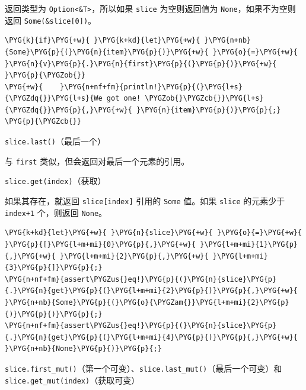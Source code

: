 返回类型为 \texttt{Option<\&T>}，所以如果 \texttt{slice} 为空则返回值为 \texttt{None}，如果不为空则返回 \texttt{Some(\&slice[0])}。

\begin{Verbatim}[commandchars=\\\{\},breaklines=true,breakanywhere=true,fontsize=\codefont,xleftmargin=17bp]
\PYG{k}{if}\PYG{+w}{ }\PYG{k+kd}{let}\PYG{+w}{ }\PYG{n+nb}{Some}\PYG{p}{(}\PYG{n}{item}\PYG{p}{)}\PYG{+w}{ }\PYG{o}{=}\PYG{+w}{ }\PYG{n}{v}\PYG{p}{.}\PYG{n}{first}\PYG{p}{(}\PYG{p}{)}\PYG{+w}{ }\PYG{p}{\PYGZob{}}
\PYG{+w}{    }\PYG{n+nf+fm}{println!}\PYG{p}{(}\PYG{l+s}{\PYGZdq{}}\PYG{l+s}{We got one! \PYGZob{}\PYGZcb{}}\PYG{l+s}{\PYGZdq{}}\PYG{p}{,}\PYG{+w}{ }\PYG{n}{item}\PYG{p}{)}\PYG{p}{;}
\PYG{p}{\PYGZcb{}}
\end{Verbatim}

\begin{mySidenote}
\texttt{slice.last()}（最后一个）
\end{mySidenote}

与 \texttt{first} 类似，但会返回对最后一个元素的引用。

\begin{mySidenote}
\texttt{slice.get(index)}（获取）
\end{mySidenote}

如果其存在，就返回 \texttt{slice[index]} 引用的 \texttt{Some} 值。如果 \texttt{slice} 的元素少于 \texttt{index+1} 个，则返回 \texttt{None}。

\begin{Verbatim}[commandchars=\\\{\},breaklines=true,breakanywhere=true,fontsize=\codefont,xleftmargin=17bp]
\PYG{k+kd}{let}\PYG{+w}{ }\PYG{n}{slice}\PYG{+w}{ }\PYG{o}{=}\PYG{+w}{ }\PYG{p}{[}\PYG{l+m+mi}{0}\PYG{p}{,}\PYG{+w}{ }\PYG{l+m+mi}{1}\PYG{p}{,}\PYG{+w}{ }\PYG{l+m+mi}{2}\PYG{p}{,}\PYG{+w}{ }\PYG{l+m+mi}{3}\PYG{p}{]}\PYG{p}{;}
\PYG{n+nf+fm}{assert\PYGZus{}eq!}\PYG{p}{(}\PYG{n}{slice}\PYG{p}{.}\PYG{n}{get}\PYG{p}{(}\PYG{l+m+mi}{2}\PYG{p}{)}\PYG{p}{,}\PYG{+w}{ }\PYG{n+nb}{Some}\PYG{p}{(}\PYG{o}{\PYGZam{}}\PYG{l+m+mi}{2}\PYG{p}{)}\PYG{p}{)}\PYG{p}{;}
\PYG{n+nf+fm}{assert\PYGZus{}eq!}\PYG{p}{(}\PYG{n}{slice}\PYG{p}{.}\PYG{n}{get}\PYG{p}{(}\PYG{l+m+mi}{4}\PYG{p}{)}\PYG{p}{,}\PYG{+w}{ }\PYG{n+nb}{None}\PYG{p}{)}\PYG{p}{;}
\end{Verbatim}

\begin{myNote}
\texttt{slice.first\_mut()}（第一个可变）、\texttt{slice.last\_mut()}（最后一个可变）和 \texttt{slice.get\_mut(index)}（获取可变）
\end{myNote}

